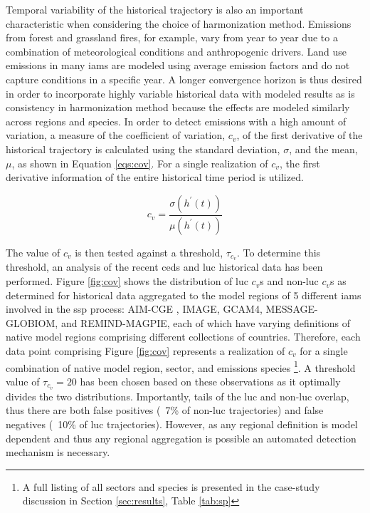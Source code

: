 \documentclass[review]{elsarticle}
\begin{document}
Temporal variability of the historical trajectory is also an important
characteristic when considering the choice of harmonization method.  Emissions
from forest and grassland fires, for example, vary from year to year due to a
combination of meteorological conditions and anthropogenic drivers. Land use
emissions in many \glspl{iam} are modeled using average emission factors and do not
capture conditions in a specific year. A longer convergence horizon is thus
desired in order to incorporate highly variable historical data with modeled
results as is consistency in harmonization method because the effects are
modeled similarly across regions and species. In order to detect emissions with
a high amount of variation, a measure of the coefficient of variation, $c_v$, of
the first derivative of the historical trajectory is calculated using the
standard deviation, $\sigma$, and the mean, $\mu$, as shown in Equation
\ref{eqs:cov}. For a single realization of $c_v$, the first derivative
information of the entire historical time period is utilized.

\begin{equation}\label{eqs:cov}
    c_v =  \frac{\sigma(h^{\prime}(t))}{\mu(h^{\prime}(t))}
\end{equation}

The value of $c_v$ is then tested against a threshold, $\tau_{c_v}$. To
determine this threshold, an analysis of the recent \gls{ceds} and \gls{luc}
historical data has been performed. Figure \ref{fig:cov} shows the distribution
of \gls{luc} $c_v$s and non-\gls{luc} $c_v$s as determined for historical data
aggregated to the model regions of 5 different \glspl{iam} involved in the
\gls{ssp} process: AIM-CGE \cite{fujimori_ssp3:_2017},
IMAGE\cite{van_vuuren_energy_2017}, GCAM4\cite{calvin_ssp4:_2017},
MESSAGE-GLOBIOM\cite{fricko_marker_2017}, and
REMIND-MAGPIE\cite{kriegler_fossil-fueled_2017}, each of which have varying
definitions of native model regions comprising different collections of
countries. Therefore, each data point comprising Figure \ref{fig:cov} represents
a realization of $c_v$ for a single combination of native model region, sector,
and emissions species \footnote{A full listing of all sectors and species is
  presented in the case-study discussion in Section \ref{sec:results}, Table
  \ref{tab:sp}}. A threshold value of $\tau_{c_v} = 20$ has been chosen based on
these observations as it optimally divides the two distributions. Importantly,
tails of the \gls{luc} and non-\gls{luc} overlap, thus there are both false
positives (~7\% of non-\gls{luc} trajectories) and false negatives (~10\% of
\gls{luc} trajectories). However, as any regional definition is model dependent
and thus any regional aggregation is possible an automated detection mechanism
is necessary.
\end{document}
